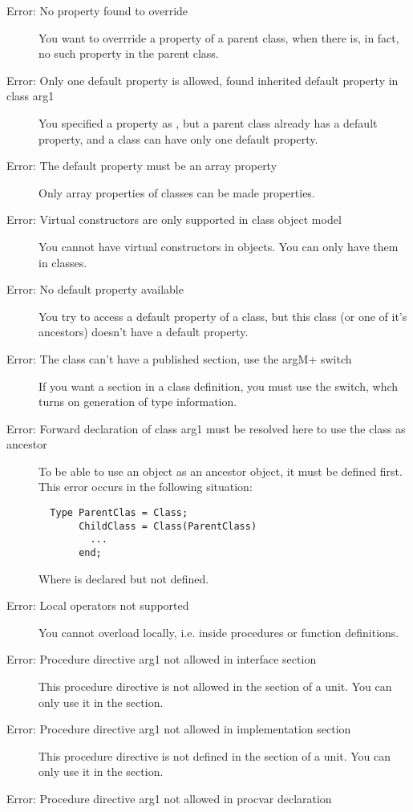 \begin{description}
\item [Error: No property found to override]
 You want to overrride a property of a parent class, when there is, in fact,
 no such property in the parent class.
\item [Error: Only one default property is allowed, found inherited default property in class arg1]
 You specified a property as , but a parent class already has a
 default property, and a class can have only one default property.
\item [Error: The default property must be an array property]
 Only array properties of classes can be made  properties.
\item [Error: Virtual constructors are only supported in class object model]
 You cannot have virtual constructors in objects. You can only have them
 in classes.
\item [Error: No default property available]
 You try to access a default property of a class, but this class (or one of
 it's ancestors) doesn't have a default property.
\item [Error: The class can't have a published section, use the {argM+} switch]
 If you want a  section in a class definition, you must
 use the  switch, whch turns on generation of type
 information.
\item [Error: Forward declaration of class arg1 must be resolved here to use the class as ancestor]
 To be able to use an object as an ancestor object, it must be defined
 first. This error occurs in the following situation:
 \begin{verbatim}
  Type ParentClas = Class;
       ChildClass = Class(ParentClass)
         ...
       end;
 \end{verbatim}
 Where  is declared but not defined.
\item [Error: Local operators not supported]
 You cannot overload locally, i.e. inside procedures or function
 definitions.
\item [Error: Procedure directive arg1 not allowed in interface section]
 This procedure directive is not allowed in the  section of
 a unit. You can only use it in the  section.
\item [Error: Procedure directive arg1 not allowed in implementation section]
 This procedure directive is not defined in the  section of
 a unit. You can only use it in the  section.
\item [Error: Procedure directive arg1 not allowed in procvar declaration]

\end{description}
